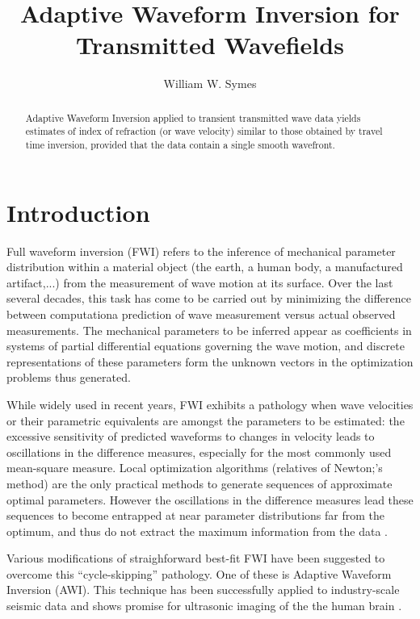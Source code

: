 \title{Adaptive Waveform Inversion for Transmitted Wavefields}
\author{William W. Symes}

\begin{abstract}
Adaptive Waveform Inversion
applied to transient transmitted wave data yields estimates of index of
refraction (or wave velocity) similar to those obtained by travel time
inversion, provided that the data contain a single smooth wavefront.
\end{abstract}

\section{Introduction}
Full waveform inversion (FWI) refers to the inference of mechanical
parameter distribution within a material object  (the earth, a human
body, a manufactured artifact,...) from the measurement of wave motion
at its surface. Over the last several decades, this task has come to
be carried out by minimizing the difference between computationa
prediction of wave measurement versus actual observed
measurements. The mechanical parameters to be inferred appear as
coefficients in systems of partial differential equations governing
the wave motion, and discrete representations of these parameters form
the unknown vectors in the optimization problems thus generated.

While widely used in recent years, FWI exhibits a pathology when wave
velocities or their parametric equivalents are amongst the parameters
to be estimated: the excessive sensitivity of predicted waveforms to
changes in velocity leads to oscillations in the difference measures,
especially for the most commonly used mean-square measure. Local
optimization algorithms (relatives of Newton;'s method) are the only practical
methods to generate sequences of approximate optimal
parameters. However the oscillations in the difference measures lead
these sequences to become entrapped at near parameter distributions
far from the optimum, and thus do not extract the maximum information
from the data \cite[]{VirieuxOperto:09}. 

Various modifications of straighforward best-fit FWI have been
suggested to overcome this ``cycle-skipping'' pathology. One of these
is Adaptive Waveform Inversion \cite[]{Warner:16} (AWI). This
technique has been successfully applied to industry-scale seismic data
\cite[]{GuaschWarnerRavaut:GEO19,Warneretal:SEG21} and shows promise for
ultrasonic imaging of the the human brain
\cite[]{Guaschetal:NPJDM20}.

